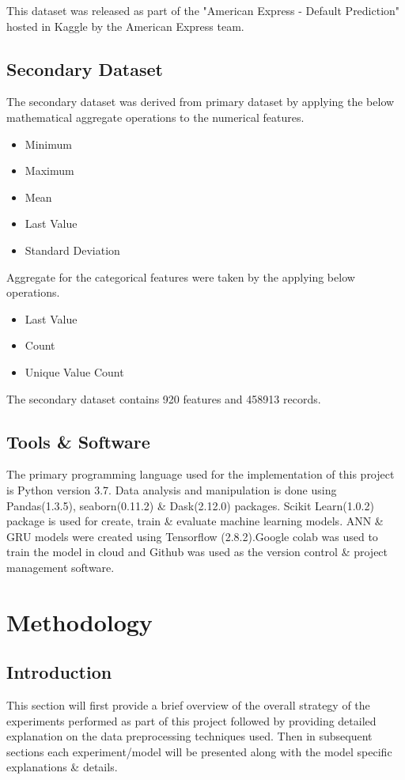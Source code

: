 \documentclass[twoside,11pt,a4paper]{article}
\begin{document}
This dataset\citep{amex-default-prediction-dataset} was released as part of the "American Express - Default Prediction" hosted in Kaggle by the American Express team.

\subsection{Secondary Dataset}
The secondary dataset was derived from primary dataset by applying the below mathematical aggregate operations to the numerical features.
\begin{itemize}
	\item Minimum 
	\item Maximum
	\item Mean
	\item Last Value
	\item Standard Deviation
\end{itemize}

Aggregate for the categorical features were taken by the applying below operations.
\begin{itemize}
	\item Last Value
	\item Count
	\item Unique Value Count
\end{itemize}

The secondary dataset contains 920 features and 458913 records.

\subsection{Tools \& Software}
The primary programming language used for the implementation of this project is Python version 3.7. Data analysis and manipulation is done using Pandas(1.3.5), seaborn(0.11.2) \& Dask(2.12.0) packages. Scikit Learn(1.0.2) package is used for create, train \& evaluate machine learning models. \acs{ANN} \& \acs{GRU} models were created using Tensorflow (2.8.2).Google colab was used to train the model in cloud and Github was used as the version control \& project management software.

\vfill
\clearpage
\section{Methodology}\label{sec:methodology}
\subsection{Introduction}
This section will first provide a brief overview of the overall strategy of the experiments performed as part of this project followed by  providing detailed explanation on the data preprocessing techniques used. Then in subsequent sections each experiment/model will be presented along with the model specific explanations \& details.
\end{document}
